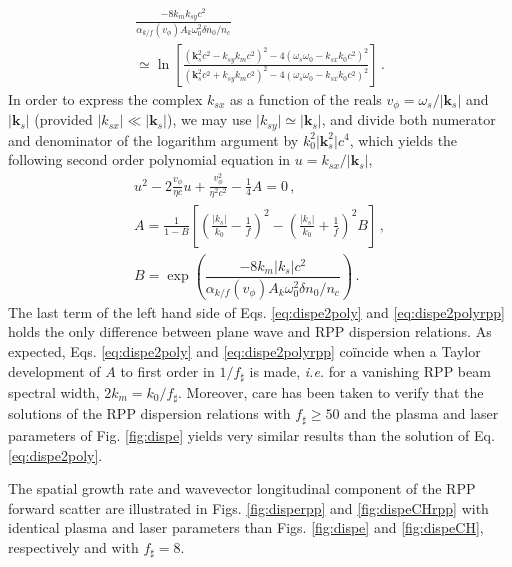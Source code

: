 \documentclass[
 reprint,
 amsmath,amssymb,
 aps,
]{revtex4-1}
\begin{document}
\begin{align}
 \frac{-8k_mk_{sy}c^2}{\alpha_{k/f}(v_\phi)A_k \omega_0^2\delta n_0/n_c  } \nonumber\\
 \simeq  \ln\left[
 \frac{ (\mathbf{k}_s^2c^2-k_{sy} k_m c^2)^2 -4(\omega_s\omega_0 - k_{sx}k_0 c^2)^2}{ (\mathbf{k}_s^2c^2+k_{sy} k_m c^2)^2 -4(\omega_s\omega_0 - k_{sx}k_0 c^2)^2} \right] \, .\label{eq:disperpp2} 
\end{align}
In order to express the complex $k_{sx}$ as a function of the reals $v_\phi=\omega_s/\vert \mathbf{k}_s\vert $ and $\vert \mathbf{k}_s\vert $ (provided  $\vert k_{sx}\vert \ll \vert \mathbf{k}_s\vert$), we may use $\vert k_{sy} \vert  \simeq \vert \mathbf{k}_s\vert$, and divide both numerator and denominator of the logarithm argument by $k_0^2\vert \mathbf{k}_s^2\vert c^4$, which yields the following second order polynomial equation in $u =  k_{sx}/\vert \mathbf{k}_s\vert$,
\begin{align}
u^2 -2\frac{v_\phi}{\eta c}u +\frac{v_\phi^2}{\eta^2 c^2}-\frac{1}{4}A =0 
\, , \nonumber\\
A= \frac{1}{1-B}\left[ \left(\frac{\vert k_{s}\vert}{k_0}-\frac{1}{f}\right)^2-\left(\frac{\vert k_{s}\vert}{k_0}+\frac{1}{f}\right)^2B  \right]\, , \nonumber \\ 
B =\exp\left(\dfrac{-8k_m \vert k_{s}\vert c^2}{\alpha_{k/f}(v_\phi)A_k \omega_0^2\delta n_0/n_c  }\right)\, . \label{eq:dispe2polyrpp} 
\end{align}
The last term of the left hand side of  Eqs. \eqref{eq:dispe2poly} and \eqref{eq:dispe2polyrpp} holds the only difference between plane wave and RPP dispersion relations. 
As expected,  Eqs.   \eqref{eq:dispe2poly} and     \eqref{eq:dispe2polyrpp} co\"incide when  a Taylor development of $A$ to first order  in $1/f_\sharp$ is made, \emph{i.e.} for a vanishing  RPP beam spectral width, $2k_m=k_0/f_\sharp$.
Moreover, care has been taken to verify that the solutions of the RPP dispersion relations with  $f_\sharp \ge 50$ and the plasma and laser parameters of Fig. \ref{fig:dispe} yields  very similar results than the solution of Eq. \eqref{eq:dispe2poly}.

The spatial growth rate and wavevector  longitudinal component of the RPP forward scatter  are illustrated in  
Figs. \ref{fig:disperpp} and \ref{fig:dispeCHrpp} with identical plasma and laser parameters than Figs.  \ref{fig:dispe} and \ref{fig:dispeCH}, respectively and  with $f_\sharp=8$.
\end{document}

